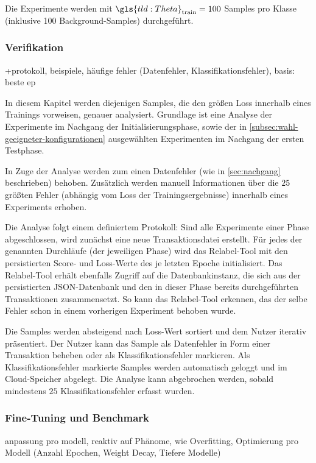 Die Experimente werden mit $\gls{tld:Theta}_\text{train} = 100$ Samples pro Klasse (inklusive 100 Background-Samples) durchgeführt.

\subsubsection{Verifikation}

+protokoll, beispiele, häufige fehler (Datenfehler, Klassifikationsfehler), basis: beste ep

In diesem Kapitel werden diejenigen Samples, die den größen Loss innerhalb eines Trainings vorweisen, genauer analysiert.
Grundlage ist eine Analyse der Experimente im Nachgang der Initialisierungsphase, sowie der in \autoref{subsec:wahl-geeigneter-konfigurationen} ausgewählten Experimenten im Nachgang der ersten Testphase.

In Zuge der Analyse werden zum einen Datenfehler (wie in \autoref{sec:nachgang} beschrieben) behoben.
Zusätzlich werden manuell Informationen über die $25$ größten Fehler (abhängig vom Loss der Trainingsergebnisse) innerhalb eines Experiments erhoben.

Die Analyse folgt einem definiertem Protokoll:
Sind alle Experimente einer Phase abgeschlossen, wird zunächst eine neue Transaktionsdatei erstellt.
Für jedes der genannten Durchläufe (der jeweiligen Phase) wird das Relabel-Tool mit den persistierten Score- und Loss-Werte des je letzten Epoche initialisiert.
Das Relabel-Tool erhält ebenfalls Zugriff auf die Datenbankinstanz, die sich aus der persistierten JSON-Datenbank und den in dieser Phase bereits durchgeführten Transaktionen zusammensetzt.
So kann das Relabel-Tool \ua erkennen, das der selbe Fehler schon in einem vorherigen Experiment behoben wurde.

Die Samples werden absteigend nach Loss-Wert sortiert und dem Nutzer iterativ präsentiert.
Der Nutzer kann das Sample als Datenfehler in Form einer Transaktion beheben oder als Klassifikationsfehler markieren.
Als Klassifikationsfehler markierte Samples werden automatisch geloggt und im Cloud-Speicher abgelegt.
Die Analyse kann abgebrochen werden, sobald mindestens $25$ Klassifikationsfehler erfasst wurden.

\subsubsection{Fine-Tuning und Benchmark}

anpassung pro modell, reaktiv auf Phänome, wie Overfitting, Optimierung pro Modell (Anzahl Epochen, Weight Decay, Tiefere Modelle)

